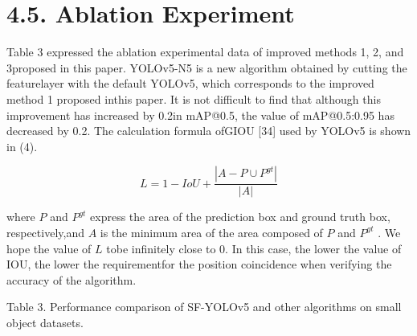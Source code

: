 \documentclass[
  10
]{article}
\begin{document}
\section{4.5. Ablation Experiment}\label{ablation-experiment}

Table 3 expressed the ablation experimental data of improved methods 1,
2, and 3proposed in this paper. YOLOv5-N5 is a new algorithm obtained by
cutting the featurelayer with the default YOLOv5, which corresponds to
the improved method 1 proposed inthis paper. It is not difficult to find
that although this improvement has increased by 0.2in mAP@0.5, the value
of mAP@0.5:0.95 has decreased by 0.2. The calculation formula ofGIOU
{[}34{]} used by YOLOv5 is shown in (4).

\[
L = 1 - I o U + \frac {\left| A - P \cup P ^ {g t} \right|}{\left| A \right|} \tag {4}
\]

where \(P\) and \(P ^ { g t }\) express the area of the prediction box
and ground truth box, respectively,and \(A\) is the minimum area of the
area composed of \(P\) and \(P ^ { g t }\) . We hope the value of \(L\)
tobe infinitely close to 0. In this case, the lower the value of IOU,
the lower the requirementfor the position coincidence when verifying the
accuracy of the algorithm.

Table 3. Performance comparison of SF-YOLOv5 and other algorithms on
small object datasets.
\end{document}
